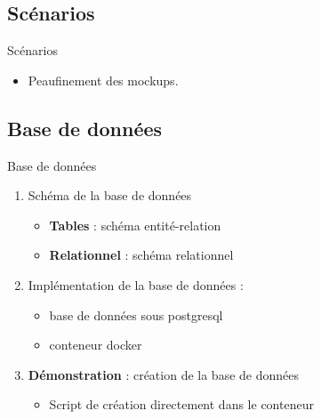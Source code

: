 \documentclass[numbering=fraction]{beamer}
\begin{document}
\subsection{Scénarios}
\begin{frame}{Scénarios}
    \begin{itemize}
        \item Peaufinement des mockups.
    \end{itemize}
\end{frame}

\subsection{Base de données}
\begin{frame}{Base de données}
    \begin{enumerate}
        \item Schéma de la base de données
        \begin{itemize}
            \item \textbf{Tables} : schéma entité-relation
            \item \textbf{Relationnel} : schéma relationnel
        \end{itemize}
        \item Implémentation de la base de données : 
        \begin{itemize}
            \item base de données sous postgresql
            \item conteneur docker
        \end{itemize}
        \item \textbf{Démonstration} : création de la base de données
        \begin{itemize}
            \item Script de création directement dans le conteneur
        \end{itemize}
    \end{enumerate}
    
\end{frame}
\end{document}
